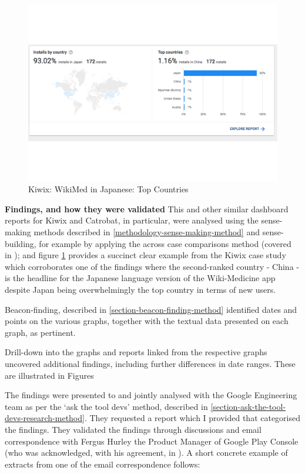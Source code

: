 \begin{figure}
    \centering
    \includegraphics{images/android-vitals-screenshots/kiwix/wikimed-japan-top-countries.pdf}
    \caption{Kiwix: WikiMed in Japanese: Top Countries}
    \label{fig:wikimed-japan-top-countries}
\end{figure}


\textbf{Findings, and how they were validated}
This and other similar dashboard reports for Kiwix and Catrobat, in particular, were analysed using the sense-making methods described in \ref{methodology-sense-making-method} and sense-building, for example by applying the across case comparisons method (covered in ); and  
figure \ref{fig:wikimed-japan-top-countries} provides a succinct clear example from the Kiwix case study which corroborates one of the findings where the second-ranked country - China - is the headline for the Japanese language version of the Wiki-Medicine app despite Japan being overwhelmingly the top country in terms of new users. 

Beacon-finding, described in \ref{section-beacon-finding-method} identified dates and points on the various graphs, together with the textual data presented on each graph, as pertinent. 

Drill-down into the graphs and reports linked from the respective graphs uncovered additional findings, including further differences in date ranges. These are illustrated in Figures 


The findings were presented to and jointly analysed with the Google Engineering team as per the `ask the tool devs' method, described in \ref{section-ask-the-tool-devs-research-method}. They requested a report which I provided that categorised the findings. They validated the findings through discussions and email correspondence with Fergus Hurley the Product Manager of Google Play Console (who was acknowledged, with his agreement, in ). A short concrete example of extracts from one of the email correspondence follows:

